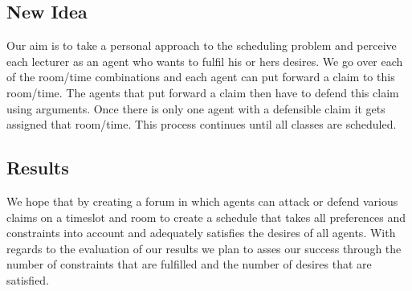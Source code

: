 \documentclass[a4paper]{article}
\begin{document}
\subsection*{New Idea}
Our aim is to take a personal approach to the scheduling problem and perceive each lecturer as an agent who wants to fulfil his or hers desires. We go over each of the room/time combinations and each agent can put forward a claim to this room/time. The agents that put forward a claim then have to defend this claim using arguments. Once there is only one agent with a defensible claim it gets assigned that room/time. This process continues until all classes are scheduled. 


\subsection*{Results}
We hope that by creating a forum in which agents can attack or defend various claims on a timeslot and room to create a schedule that takes all preferences and constraints into account and adequately satisfies the desires of all agents. With regards to the evaluation of our results we plan to asses our success through the number of constraints that are fulfilled and the number of desires that are satisfied.



\end{document}

